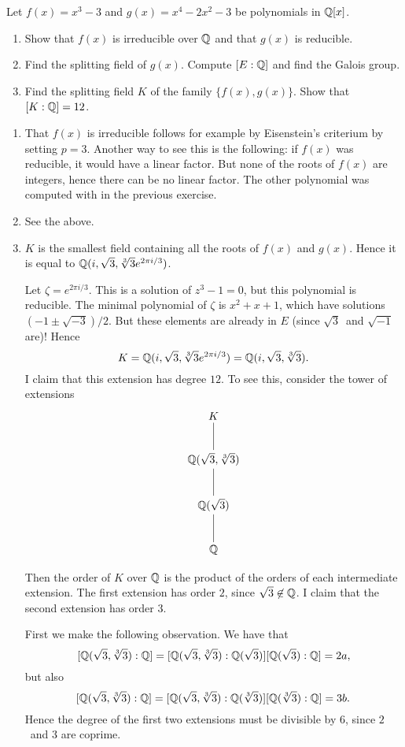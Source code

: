 \documentclass[11pt, english]{article}
\begin{document}
\begin{exc}[Eksamen 2010, 3]
Let $f(x)=x^3-3$ and $g(x)=x^4-2x^2-3$ be polynomials in $\mathbb{Q}[x]$.
\begin{enumerate}
	\item Show that $f(x)$ is irreducible over $\mathbb{Q}$ and that $g(x)$ is reducible.
	\item Find the splitting field of $g(x)$. Compute $[E:\mathbb{Q}]$ and find the Galois group. 
	\item Find the splitting field $K$ of the family $\{ f(x), g(x) \} $. Show that $[K:\mathbb{Q}]=12$.
\end{enumerate}
\end{exc}
\begin{sol}
\begin{enumerate}
	\item That $f(x)$ is irreducible follows for example by Eisenstein's criterium by setting $p=3$. Another way to see this is the following: if $f(x)$ was reducible, it would have a linear factor. But none of the roots of $f(x)$ are integers, hence there can be no linear factor. The other polynomial was computed with in the previous exercise.
	\item See the above.
	\item $K$ is the smallest field containing all the roots of $f(x)$ and $g(x)$. Hence it is equal to $\mathbb{Q}(i,\sqrt 3, \sqrt[3]{3}e^{2 \pi i/3})$.

	Let $\zeta = e^{2 \pi i/3}$. This is a solution of $z^3-1=0$, but this polynomial is reducible. The minimal polynomial of $\zeta$ is $x^2+x+1$, which have solutions $(-1 \pm \sqrt{-3})/2$. But these elements are already in $E$ (since $\sqrt 3$ and $\sqrt {-1}$ are)! Hence
	$$
	K = \mathbb{Q}(i, \sqrt 3, \sqrt[3]{3}e^{2\pi i/3}) = \mathbb{Q}(i, \sqrt 3, \sqrt[3]{3}).
	$$
	I claim that this extension has degree $12$. To see this, consider the tower of extensions
	$$
\xymatrix{
K \ar@{-}[d] \\
\Q(\sqrt{3},\sqrt[3]{3})\ar@{-}[d] \\
\Q(\sqrt{3})\ar@{-}[d] \\
\Q
}
	$$

	Then the order of $K$ over $\mathbb{Q}$ is the product of the orders of each intermediate extension. The first extension has order $2$, since $\sqrt{3} \not \in \mathbb{Q}$. I claim that the second extension has order $3$.

	First we make the following observation. We have that 
	$$
	[\mathbb{Q}(\sqrt 3, \sqrt[3]3):\mathbb{Q}]=[\mathbb{Q}(\sqrt 3,\sqrt[3]3):\mathbb{Q}(\sqrt 3)][\mathbb{Q}(\sqrt 3):\mathbb{Q}]=2a,
	$$
	 but also
	 $$
	 	[\mathbb{Q}(\sqrt 3, \sqrt[3]3):\mathbb{Q}]=[\mathbb{Q}(\sqrt 3,\sqrt[3]3):\mathbb{Q}(\sqrt[3] 3)][\mathbb{Q}(\sqrt[3] 3):\mathbb{Q}]=3b.
	 	$$
	 Hence the degree of the first two extensions must be divisible by $6$, since $2$ and $3$ are coprime.


\end{enumerate}
\end{sol}
\end{document}
